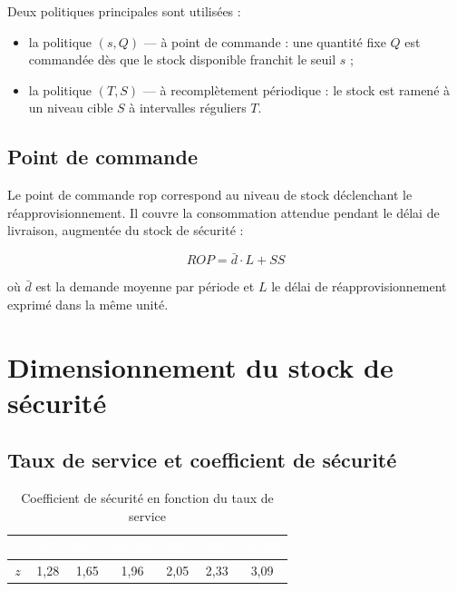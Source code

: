 Deux politiques principales sont utilisées :

\begin{itemize}
  \item la politique \textbf{$(s, Q)$} — à point de commande : une quantité
    fixe $Q$ est commandée dès que le stock disponible franchit le seuil $s$ ;
  \item la politique \textbf{$(T, S)$} — à recomplètement périodique : le stock
    est ramené à un niveau cible $S$ à intervalles réguliers $T$.
\end{itemize}

\subsection{Point de commande}

Le point de commande \gls{rop} correspond au niveau de stock déclenchant le
réapprovisionnement. Il couvre la consommation attendue pendant le délai de
livraison, augmentée du stock de sécurité :

\begin{equation}
  ROP = \bar{d} \cdot L + SS
  \label{eq:rop}
\end{equation}

où $\bar{d}$ est la demande moyenne par période et $L$ le délai de
réapprovisionnement exprimé dans la même unité.

\section{Dimensionnement du stock de sécurité}
\label{sec:stock_securite}

\subsection{Taux de service et coefficient de sécurité}


\begin{table}[H]
  \centering
  \caption{Coefficient de sécurité en fonction du taux de service}
  \label{tab:coef_z}
  \renewcommand{\arraystretch}{1.4}
  \begin{tabular}{|c|c|c|c|c|c|c|}
    \hline
    \rowcolor{iacsTableHead}
    \textcolor{white}{\textbf{$\alpha$}} &
    \textcolor{white}{90\%} & \textcolor{white}{95\%} &
    \textcolor{white}{97,5\%} & \textcolor{white}{98\%} &
    \textcolor{white}{99\%} & \textcolor{white}{99,9\%} \\
    \hline
    $z$ & 1,28 & 1,65 & 1,96 & 2,05 & 2,33 & 3,09 \\
    \hline
  \end{tabular}
\end{table}

